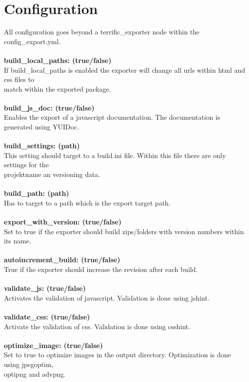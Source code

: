\section{Configuration}

All configuration goes beyond a terrific\_exporter node within the config\_export.yml.\\
\\
\textbf{build\_local\_paths: (true/false)}\\
If build\_local\_paths is enabled the exporter will change all urls within html and css files to \\match within the exported package.\\
\\
\textbf{build\_js\_doc: (true/false)} \\
Enables the export of a javascript documentation. The documentation is generated using YUIDoc. \\
\\
\textbf{build\_settings: (path)}\\
This setting should target to a build.ini file. Within this file there are only settings for the \\projektname an versioning data.\\
\\
\textbf{build\_path: (path)}\\
Has to target to a path which is the export target path.\\
\\
\textbf{export\_with\_version: (true/false)}\\
Set to true if the exporter should build zips/folders with version numbers within its name.\\
\\
\textbf{autoincrement\_build: (true/false)}\\
True if the exporter should increase the revision after each build.\\
\\
\textbf{validate\_js: (true/false)}\\
Activates the validation of javascript. Validation is done using jshint.\\
\\
\textbf{validate\_css: (true/false)}\\
Activate the validation of css. Validation is done using csshint.\\
\\
\textbf{optimize\_image: (true/false)}\\
Set to true to optimize images in the output directory. Optimization is done using jpegoptim, \\optipng and advpng.\\
